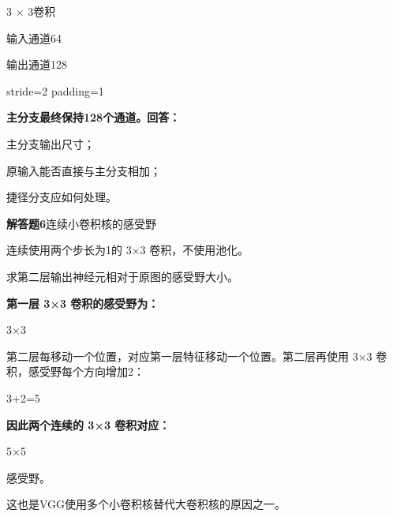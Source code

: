 \documentclass[UTF8,openany,oneside,zihao=-4,fontset=windows]{ctexbook}
\newif\ifshowsolutions
\newcommand{\Question}[2]{%
  \par\Needspace{4\baselineskip}\medskip
  \noindent\textbf{\color{MVBlue}#1}\quad #2\par
}
\newenvironment{AnswerBox}{\begin{tcolorbox}[breakable,colback=MVLight,colframe=MVBlue!45,title={参考答案},fonttitle=\bfseries,boxrule=0.55pt,arc=1.5mm,left=2mm,right=2mm,top=1.5mm,bottom=1.5mm]}{\end{tcolorbox}}
\newcommand{\PracticeSpace}[1]{\ifshowsolutions\else\par\vspace{#1}\par\fi}
\begin{document}
\par 3 × 3卷积
\par 输入通道64
\par 输出通道128
\begin{center}\small\ttfamily stride=2 padding=1\end{center}
\par\noindent\textbf{主分支最终保持128个通道。回答：}
\par\noindent\textbullet\quad 主分支输出尺寸；
\par\noindent\textbullet\quad 原输入能否直接与主分支相加；
\par 捷径分支应如何处理。
\ifshowsolutions
\begin{AnswerBox}
\par\noindent\textbf{主分支空间尺寸：}
\begin{center}\small\ttfamily floor((56 + 2 - 3)/2) + 1 = 28\end{center}
\par\noindent\textbf{因此主分支输出：}
\par N×128×28×28
\par\noindent\textbf{原输入为：}
\par N×64×56×56
\par 通道数和空间尺寸均不同，不能直接相加。
\par\noindent\textbf{捷径分支应使用：}
\par\noindent\textbullet\quad 1×1 卷积；
\par\noindent\textbullet\quad 输出通道数128；
\par 步长2。
\par\noindent\textbf{得到：}
\par N×128×28×28
\par 之后再与主分支相加。
\end{AnswerBox}
\else
\PracticeSpace{4.2cm}
\fi
\Question{解答题6}{连续小卷积核的感受野}
\par 连续使用两个步长为1的 3×3 卷积，不使用池化。
\par 求第二层输出神经元相对于原图的感受野大小。
\ifshowsolutions
\begin{AnswerBox}
\par\noindent\textbf{第一层 3×3 卷积的感受野为：}
\par 3×3
\par 第二层每移动一个位置，对应第一层特征移动一个位置。第二层再使用 3×3 卷积，感受野每个方向增加2：
\par 3+2=5
\par\noindent\textbf{因此两个连续的 3×3 卷积对应：}
\par 5×5
\par 感受野。
\par 这也是VGG使用多个小卷积核替代大卷积核的原因之一。
\end{AnswerBox}
\end{document}
